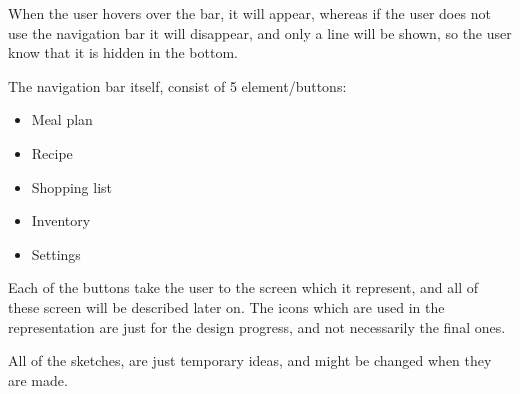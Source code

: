 When the user hovers over the bar, it will appear, whereas if the user does not use the navigation bar it will disappear, and only a line will be shown, so the user know that it is hidden in the bottom.

The navigation bar itself, consist of 5 element/buttons:

\begin{itemize}
    \item Meal plan
    \item Recipe
    \item Shopping list
    \item Inventory
    \item Settings
\end{itemize}

Each of the buttons take the user to the screen which it represent, and all of these screen will be described later on. The icons which are used in the representation are just for the design progress, and not necessarily the final ones.

All of the sketches, are just temporary ideas, and might be changed when they are made.






